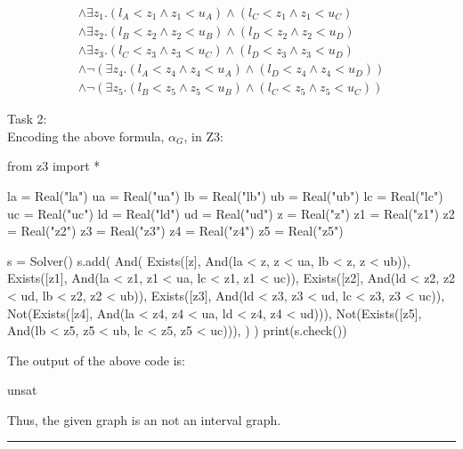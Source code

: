 \documentclass[12pt,letterpaper, onecolumn]{exam}
\begin{document}
\begin{questions}
\begin{align*}
		\land \exists z_1. (l_{A} < z_1 \land z_1 < u_{A}) \land (l_{C} < z_1 \land z_1 < u_{C}) \\
		\land \exists z_2. (l_{B} < z_2 \land z_2 < u_{B}) \land (l_{D} < z_2 \land z_2 < u_{D}) \\
		\land \exists z_3. (l_{C} < z_3 \land z_3 < u_{C}) \land (l_{D} < z_3 \land z_3 < u_{D}) \\
		\land \neg (\exists z_4. (l_{A} < z_4 \land z_4 < u_{A}) \land (l_{D} < z_4 \land z_4 < u_{D})) \\
		\land \neg (\exists z_5. (l_{B} < z_5 \land z_5 < u_{B}) \land (l_{C} < z_5 \land z_5 < u_{C}))
	\end{align*}
	
	Task 2: \\
	Encoding the above formula, $\alpha_G$, in Z3:
	\begin{python}
from z3 import *

la = Real("la")
ua = Real("ua")
lb = Real("lb")
ub = Real("ub")
lc = Real("lc")
uc = Real("uc")
ld = Real("ld")
ud = Real("ud")
z = Real("z")
z1 = Real("z1")
z2 = Real("z2")
z3 = Real("z3")
z4 = Real("z4")
z5 = Real("z5")

s = Solver()
s.add(
	And(
		Exists([z], And(la < z, z < ua, lb < z, z < ub)),
		Exists([z1], And(la < z1, z1 < ua, lc < z1, z1 < uc)),
		Exists([z2], And(ld < z2, z2 < ud, lb < z2, z2 < ub)),
		Exists([z3], And(ld < z3, z3 < ud, lc < z3, z3 < uc)),
		Not(Exists([z4], And(la < z4, z4 < ua, ld < z4, z4 < ud))),
		Not(Exists([z5], And(lb < z5, z5 < ub, lc < z5, z5 < uc))),
	)
)
print(s.check())
	\end{python}
	The output of the above code is:
	\begin{python}
unsat
	\end{python}
	Thus, the given graph is an not an interval graph. \\
	
    {\rule{17cm}{0.4pt}}
	\question[]
	\solutiontitle


\end{questions}
\end{document}
